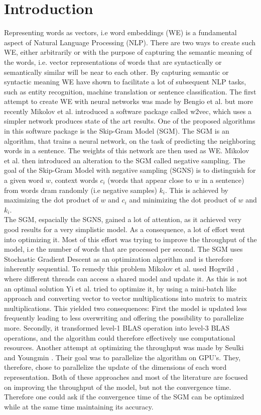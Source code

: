 
\section{Introduction}\label{sec:introduction}

Representing words as vectors, i.e word embeddings (WE) is a fundamental aspect of Natural Language Processing (NLP). There are two ways to create such WE, either arbitrarily or with the purpose of capturing the semantic meaning of the words, i.e. vector representations of words that are syntactically or semantically similar will be near to each other. By capturing semantic or syntactic meaning WE have shown to facilitate a lot of subsequent NLP tasks, such as entity recognition, machine translation or sentence classification. %
The first attempt to create WE with neural networks was made by Bengio et al. \cite{bengio} but more recently Mikolov et al. \cite{mikolov} introduced a software package called w2vec, which uses a simpler network produces state of the art results. One of the proposed algorithms in this software package is the Skip-Gram Model (SGM). The SGM is an algorithm, that trains a neural network, on the task of predicting the neighboring words in a sentence. The weights of this network are then used as WE. Mikolov et al. \cite{mikolov2} then introduced an alteration to the SGM called negative sampling. The goal of the Skip-Gram Model with negative sampling (SGNS) is to distinguish for a given word $w$, context words $c_i$ (words that appear close to $w$ in a sentence) from words dram randomly (i.e negative samples) $k_i$. This is achieved by maximizing the dot product of $w$ and $c_i$ and minimizing the dot product of $w$ and $k_i$.\\
The SGM, espacially the SGNS, gained a lot of attention, as it achieved very good results for a very simplistic model. As a consequence, a lot of effort went into optimizing it. Most of this effort was trying to improve the throughput of the model, i.e the number of words that are processed per second. The SGM uses Stochastic Gradient Descent as an optimization algorithm and is therefore inherently sequential. To remedy this problem Mikolov et al. used Hogwild \cite{hogwild}, where different threads can access a shared model and update it. As this is not an optimal solution Yi et al. \cite{intel} tried to optimize it, by using a mini-batch like approach and converting vector to vector multiplications into matrix to matrix multiplications. This yielded two consequences: First the model is updated less frequently leading to less overwriting and offering the possibility to parallelize more. Secondly, it transformed level-1 BLAS operation into level-3 BLAS operations, and the algorithm could therefore effectively use computational resources. Another attempt at optimizing the throughput was made by Seulki and Youngmin \cite{gpu}. Their goal was to parallelize the algorithm on GPU's. They, therefore, chose to parallelize the update of the dimensions of each word representation. Both of these approaches and most of the literature are focused on improving the throughput of the model, but not the convergence time.  Therefore one could ask if the convergence time of the SGM can be optimized while at the same time maintaining its accuracy.\\
